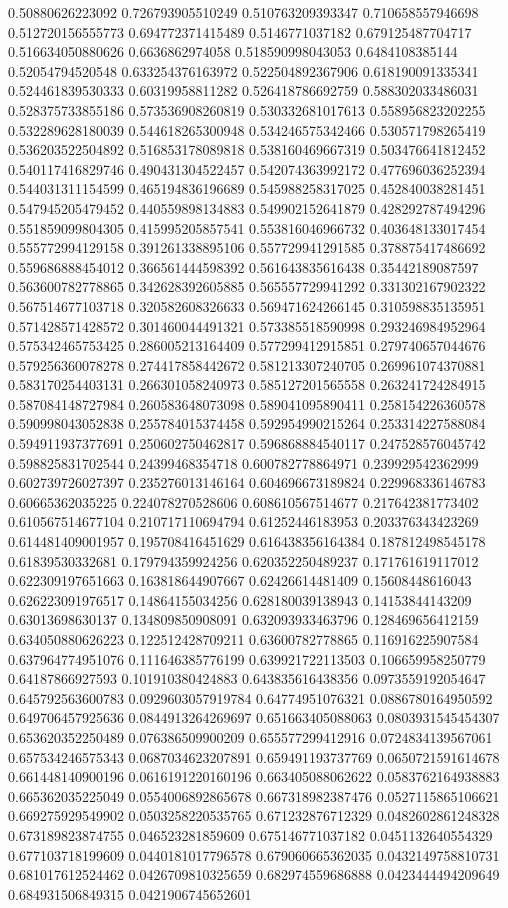 \begin{table}
\begin{tabu}
\begin{sparkline}{10}
0.50880626223092 0.726793905510249 0.510763209393347 0.710658557946698 0.512720156555773 0.694772371415489 0.5146771037182 0.679125487704717 0.516634050880626 0.6636862974058 0.518590998043053 0.6484108385144 0.52054794520548 0.633254376163972 0.522504892367906 0.618190091335341 0.524461839530333 0.60319958811282 0.526418786692759 0.588302033486031 0.528375733855186 0.573536908260819 0.530332681017613 0.558956823202255 0.532289628180039 0.544618265300948 0.534246575342466 0.530571798265419 0.536203522504892 0.516853178089818 0.538160469667319 0.503476641812452 0.540117416829746 0.490431304522457 0.542074363992172 0.477696036252394 0.544031311154599 0.465194836196689 0.545988258317025 0.452840038281451 0.547945205479452 0.440559898134883 0.549902152641879 0.428292787494296 0.551859099804305 0.415995205857541 0.553816046966732 0.403648133017454 0.555772994129158 0.391261338895106 0.557729941291585 0.378875417486692 0.559686888454012 0.366561444598392 0.561643835616438 0.35442189087597 0.563600782778865 0.342628392605885 0.565557729941292 0.331302167902322 0.567514677103718 0.320582608326633 0.569471624266145 0.310598835135951 0.571428571428572 0.301460044491321 0.573385518590998 0.293246984952964 0.575342465753425 0.286005213164409 0.577299412915851 0.279740657044676 0.579256360078278 0.274417858442672 0.581213307240705 0.269961074370881 0.583170254403131 0.266301058240973 0.585127201565558 0.263241724284915 0.587084148727984 0.260583648073098 0.589041095890411 0.258154226360578 0.590998043052838 0.255784015374458 0.592954990215264 0.253314227588084 0.594911937377691 0.250602750462817 0.596868884540117 0.247528576045742 0.598825831702544 0.24399468354718 0.600782778864971 0.239929542362999 0.602739726027397 0.235276013146164 0.604696673189824 0.229968336146783 0.60665362035225 0.224078270528606 0.608610567514677 0.217642381773402 0.610567514677104 0.210717110694794 0.61252446183953 0.203376343423269 0.614481409001957 0.195708416451629 0.616438356164384 0.187812498545178 0.61839530332681 0.179794359924256 0.620352250489237 0.171761619117012 0.622309197651663 0.163818644907667 0.62426614481409 0.15608448616043 0.626223091976517 0.14864155034256 0.628180039138943 0.14153844143209 0.63013698630137 0.134809850908091 0.632093933463796 0.128469656412159 0.634050880626223 0.122512428709211 0.63600782778865 0.116916225907584 0.637964774951076 0.111646385776199 0.639921722113503 0.106659958250779 0.64187866927593 0.101910380424883 0.643835616438356 0.0973559192054647 0.645792563600783 0.0929603057919784 0.64774951076321 0.0886780164950592 0.649706457925636 0.0844913264269697 0.651663405088063 0.0803931545454307 0.653620352250489 0.076386509900209 0.655577299412916 0.0724834139567061 0.657534246575343 0.0687034623207891 0.659491193737769 0.0650721591614678 0.661448140900196 0.0616191220160196 0.663405088062622 0.0583762164938883 0.665362035225049 0.0554006892865678 0.667318982387476 0.0527115865106621 0.669275929549902 0.0503258220535765 0.671232876712329 0.0482602861248328 0.673189823874755 0.046523281859609 0.675146771037182 0.0451132640554329 0.677103718199609 0.0440181017796578 0.679060665362035 0.0432149758810731 0.681017612524462 0.0426709810325659 0.682974559686888 0.0423444494209649 0.684931506849315 0.0421906745652601 
\end{sparkline}
\end{tabu}
\end{table}
